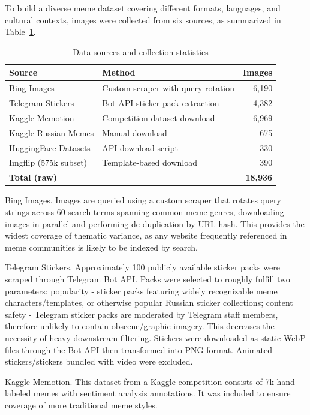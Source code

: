 \documentclass[a4paper,12pt]{article}
\begin{document}
To build a diverse meme dataset covering different formats, languages, and cultural contexts, images were collected from six sources, as summarized in Table~\ref{tab:sources}.

\begin{table}[H]
\centering
\caption{Data sources and collection statistics}
\label{tab:sources}
\begin{tabular}{|l|l|r|}
\hline
Source & Method & Images \\
\hline
Bing Images & Custom scraper with query rotation & 6,190 \\
\hline
Telegram Stickers & Bot API sticker pack extraction & 4,382 \\
\hline
Kaggle Memotion & Competition dataset download & 6,969 \\
\hline
Kaggle Russian Memes & Manual download & 675 \\
\hline
HuggingFace Datasets & API download script & 330 \\
\hline
Imgflip (575k subset) & Template-based download & 390 \\
\hline
\textbf{Total (raw)} & & \textbf{18,936} \\
\hline
\end{tabular}
\end{table}

Bing Images. Images are queried using a custom scraper that rotates query strings across 60 search terms spanning common meme genres, downloading images in parallel and performing de-duplication by URL hash. This provides the widest coverage of thematic variance, as any website frequently referenced in meme communities is likely to be indexed by search.

Telegram Stickers. Approximately 100 publicly available sticker packs were scraped through Telegram Bot API. Packs were selected to roughly fulfill two parameters: popularity - sticker packs featuring widely recognizable meme characters/templates, or otherwise popular Russian sticker collections; content safety - Telegram sticker packs are moderated by Telegram staff members, therefore unlikely to contain obscene/graphic imagery. This decreases the necessity of heavy downstream filtering. Stickers were downloaded as static WebP files through the Bot API then transformed into PNG format. Animated stickers/stickers bundled with video were excluded.

Kaggle Memotion. This dataset from a Kaggle competition consists of 7k hand-labeled memes with sentiment analysis annotations. It was included to ensure coverage of more traditional meme styles.
\end{document}
